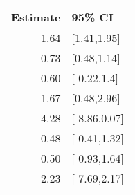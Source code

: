 \begin{tabular}{rl}
  \hline
Estimate & 95\% CI \\ 
  \hline
1.64 & [1.41,1.95] \\ 
  0.73 & [0.48,1.14] \\ 
  0.60 & [-0.22,1.4] \\ 
  1.67 & [0.48,2.96] \\ 
  -4.28 & [-8.86,0.07] \\ 
  0.48 & [-0.41,1.32] \\ 
  0.50 & [-0.93,1.64] \\ 
  -2.23 & [-7.69,2.17] \\ 
   \hline
\end{tabular}

